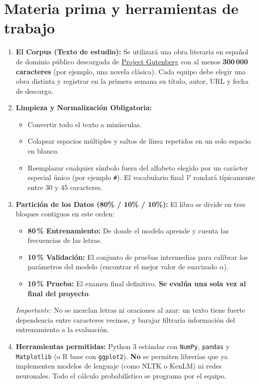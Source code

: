\documentclass[11pt,letterpaper]{article}
\begin{document}
\section{Materia prima y herramientas de trabajo}

\begin{enumerate}[leftmargin=0.7cm, itemsep=2pt, parsep=0pt]
    \item \textbf{El Corpus (Texto de estudio):}
    Se utilizará una obra literaria en español de dominio público descargada de \href{https://www.gutenberg.org}{Project Gutenberg} con al menos \textbf{300\,000 caracteres} (por ejemplo, una novela clásica). Cada equipo debe elegir una obra distinta y registrar en la primera semana su título, autor, URL y fecha de descarga.
    
    \item \textbf{Limpieza y Normalización Obligatoria:}
    \begin{itemize}[itemsep=0.5pt, parsep=0pt]
        \item Convertir todo el texto a minúsculas.
        \item Colapsar espacios múltiples y saltos de línea repetidos en un solo espacio en blanco.
        \item Reemplazar cualquier símbolo fuera del alfabeto elegido por un carácter especial único (por ejemplo \texttt{\#}). El vocabulario final $\mathcal{V}$ rondará típicamente entre 30 y 45 caracteres.
    \end{itemize}

    \item \textbf{Partición de los Datos (80\% / 10\% / 10\%):}
    El libro se divide en tres bloques contiguos en este orden:
    \begin{itemize}[itemsep=0.5pt, parsep=0pt]
        \item \textbf{80\,\% Entrenamiento:} De donde el modelo aprende y cuenta las frecuencias de las letras.
        \item \textbf{10\,\% Validación:} El conjunto de pruebas intermedias para calibrar los parámetros del modelo (encontrar el mejor valor de suavizado $\alpha$).
        \item \textbf{10\,\% Prueba:} El examen final definitivo. \textbf{Se evalúa una sola vez al final del proyecto}.
    \end{itemize}
    \textit{Importante:} No se mezclan letras ni oraciones al azar: un texto tiene fuerte dependencia entre caracteres vecinos, y barajar filtraría información del entrenamiento a la evaluación.
    
    \item \textbf{Herramientas permitidas:}
    Python 3 estándar con \texttt{NumPy}, \texttt{pandas} y \texttt{Matplotlib} (o R base con \texttt{ggplot2}). \textbf{No} se permiten librerías que ya implementen modelos de lenguaje (como NLTK o KenLM) ni redes neuronales. Todo el cálculo probabilístico se programa por el equipo.
\end{enumerate}
\end{document}
